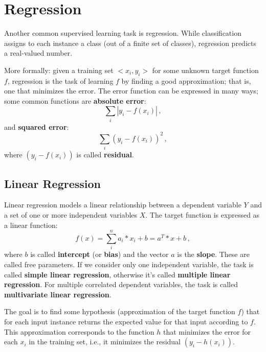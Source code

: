 \chapter{Regression}

Another common supervised learning task is regression. While classification assigns to each instance a class (out of a finite set of classes), regression predicts a real-valued number.

More formally: given a training set $<x_i, y_i>$ for some unknown target function $f$, regression is the task of learning $f$ by finding a good approximation; that is, one that minimizes the error. The error function can be expressed in many ways; some common functions are \textbf{absolute error}:
\begin{equation*}
    \sum_i |y_i - f(x_i)| \,,
\end{equation*}
and \textbf{squared error}:
\begin{equation*}
    \sum_i (y_i - f(x_i))^2 \,,
\end{equation*}
where $(y_i - f(x_i))$ is called \textbf{residual}.

\section{Linear Regression}

Linear regression models a linear relationship between a dependent variable $Y$ and a set of one or more independent variables $X$. The target function is expressed as a linear function:
\begin{equation*}
    f(x) = \sum_i^n a_i*x_i + b = a^T*x + b\,,
\end{equation*}
where $b$ is called \textbf{intercept} (or \textbf{bias}) and the vector $a$ is the \textbf{slope}. These are called free parameters. If we consider only one independent variable, the task is called \textbf{simple linear regression}, otherwise it's called \textbf{multiple linear regression}. For multiple correlated dependent variables, the task is called \textbf{multivariate linear regression}.

The goal is to find some hypothesis (approximation of the target function $f$) that for each input instance returns the expected value for that input according to $f$. This approximation corresponds to the function $h$ that minimizes the error for each $x_i$ in the training set, i.e., it minimizes the residual $(y_i - h(x_i))$.

